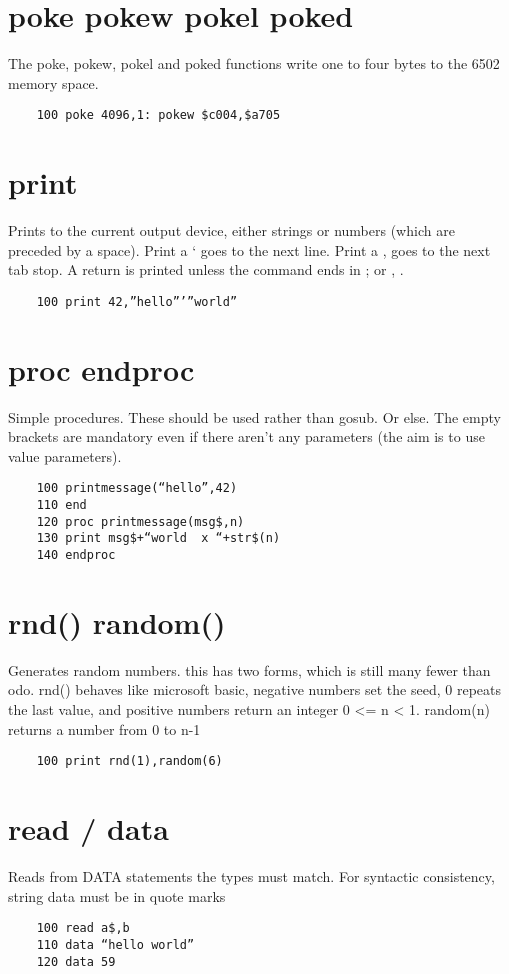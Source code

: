 \section*{poke pokew pokel poked}
The poke, pokew, pokel and poked functions write one to four bytes to the 6502 memory space.
\example{}
\begin{verbatim}
	100 poke 4096,1: pokew $c004,$a705
\end{verbatim}

\section*{print}
Prints to the current output device, either strings or numbers (which are preceded by a space). Print a ‘ goes to the next line. Print a , goes to the next tab stop. A return is printed unless the command ends in ; or , . 
\example{}
\begin{verbatim}
	100 print 42,”hello”’”world”
\end{verbatim}

\section*{proc endproc}
Simple procedures. These should be used rather than gosub. Or else.  The empty brackets are mandatory even if there aren’t any parameters (the aim is to use value parameters).
\example{}
\begin{verbatim}
	100 printmessage(“hello”,42)
	110 end
	120 proc printmessage(msg$,n)
	130 print msg$+“world  x “+str$(n)
	140 endproc
\end{verbatim}

\section*{rnd() random()}
Generates random numbers. this has two forms, which is still many fewer than odo. rnd() behaves like microsoft basic, negative numbers set the seed,  0 repeats the last value, and positive numbers return an integer 0 <= n < 1. random(n) returns a number from 0 to n-1
\example{}
\begin{verbatim}
	100 print rnd(1),random(6)
\end{verbatim}

\section*{read / data}
Reads from DATA statements the types must match. For syntactic consistency, string data must be in quote marks
\example{}
\begin{verbatim}
	100 read a$,b
	110 data “hello world”
	120 data 59
\end{verbatim}

